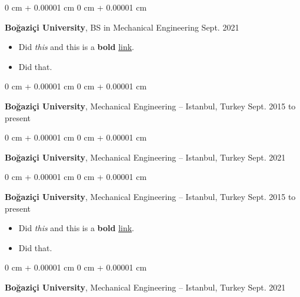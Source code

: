 \documentclass[10pt, letterpaper]{article}
\newenvironment{highlights}{
    \begin{itemize}[
        topsep=0.10 cm,
        parsep=0.10 cm,
        partopsep=0pt,
        itemsep=0pt,
        leftmargin=0 cm + 10pt
    ]
}{
    \end{itemize}
        
    \vspace{-0.20cm}
} %
\newenvironment{onecolentry}{
    \begin{adjustwidth}{
        0 cm + 0.00001 cm
    }{
        0 cm + 0.00001 cm
    }
}{
    \end{adjustwidth}
} %
\begin{document}
        \begin{onecolentry}
            \textbf{Boğaziçi University}, BS in Mechanical Engineering \hfill Sept. 2021
            \begin{highlights}
                \item Did \textit{this} and this is a \textbf{bold} \href{https://example.com}{link}.
                \item Did that.
            \end{highlights}
        \end{onecolentry}

        \vspace{0.1 cm}

        \begin{onecolentry}
            \textbf{Boğaziçi University}, Mechanical Engineering -- Istanbul, Turkey \hfill Sept. 2015 to present
        \end{onecolentry}

        \vspace{0.1 cm}

        \begin{onecolentry}
            \textbf{Boğaziçi University}, Mechanical Engineering -- Istanbul, Turkey \hfill Sept. 2021
        \end{onecolentry}

        \vspace{0.1 cm}

        \begin{onecolentry}
            \textbf{Boğaziçi University}, Mechanical Engineering -- Istanbul, Turkey \hfill Sept. 2015 to present
            \begin{highlights}
                \item Did \textit{this} and this is a \textbf{bold} \href{https://example.com}{link}.
                \item Did that.
            \end{highlights}
        \end{onecolentry}

        \vspace{0.1 cm}

        \begin{onecolentry}
            \textbf{Boğaziçi University}, Mechanical Engineering -- Istanbul, Turkey \hfill Sept. 2021
        \end{onecolentry}

        \vspace{0.1 cm}
\end{document}
